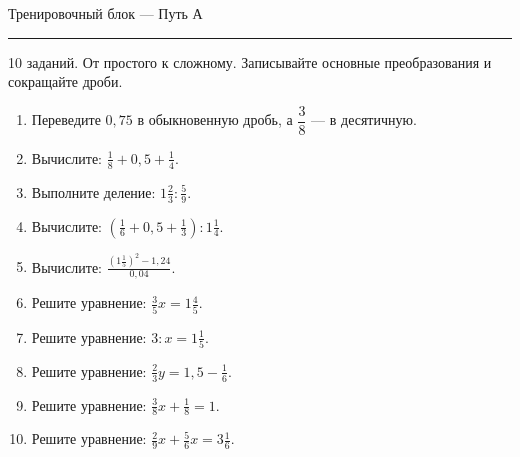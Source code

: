 \documentclass[a4paper,12pt]{article}
\newcommand{\sect}[1]{%
  \vspace{5pt}%
  {\Large\color{darkaccent}#1\par}%
  \vspace{2pt}%
  {\color{accent}\rule{\linewidth}{0.55pt}\par}%
  \vspace{5pt}%
}
\begin{document}
\clearpage
\sect{Тренировочный блок --- Путь А}
\textcolor{muted}{10 заданий. От простого к сложному. Записывайте основные преобразования и сокращайте дроби.}
\vspace{2mm}
\begin{enumerate}[itemsep=11pt]
\item Переведите $0,75$ в обыкновенную дробь, а $\dfrac38$ --- в десятичную.
\item Вычислите: $\displaystyle \frac18+0,5+\frac14$.
\item Выполните деление: $\displaystyle 1\frac23:\frac59$.
\item Вычислите: $\displaystyle \left(\frac16+0,5+\frac13\right):1\frac14$.
\item Вычислите: $\displaystyle \frac{\left(1\frac15\right)^2-1,24}{0,04}$.
\item Решите уравнение: $\displaystyle \frac35x=1\frac45$.
\item Решите уравнение: $\displaystyle 3:x=1\frac15$.
\item Решите уравнение: $\displaystyle \frac23y=1,5-\frac16$.
\item Решите уравнение: $\displaystyle \frac38x+\frac18=1$.
\item Решите уравнение: $\displaystyle \frac29x+\frac56x=3\frac16$.
\end{enumerate}
\end{document}
